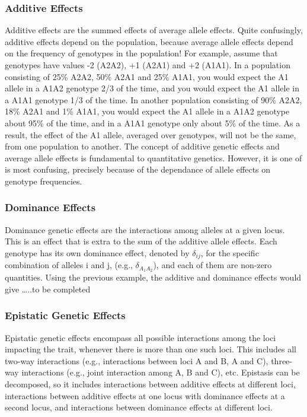 \documentclass[
]{book}
\begin{document}
\hypertarget{additive-effects}{%
\subsubsection{Additive Effects}\label{additive-effects}}

Additive effects are the summed effects of average allele effects. Quite confusingly, additive effects depend on the population, because average allele effects depend on the frequency of genotypes in the population! For example, assume that genotypes have values -2 (A2A2), +1 (A2A1) and +2 (A1A1). In a population consisting of 25\% A2A2, 50\% A2A1 and 25\% A1A1, you would expect the A1 allele in a A1A2 genotype 2/3 of the time, and you would expect the A1 allele in a A1A1 genotype 1/3 of the time. In another population consisting of 90\% A2A2, 18\% A2A1 and 1\% A1A1, you would expect the A1 allele in a A1A2 genotype about 95\% of the time, and in a A1A1 genotype only about 5\% of the time. As a result, the effect of the A1 allele, averaged over genotypes, will not be the same, from one population to another.
The concept of additive genetic effects and average allele effects is fundamental to quantitative genetics. However, it is one of is most confusing, precisely because of the dependance of allele effects on genotype frequencies.

\hypertarget{dominance-effects}{%
\subsubsection{Dominance Effects}\label{dominance-effects}}

Dominance genetic effects are the interactions among alleles at a given locus. This is an effect that is extra to the sum of the additive allele effects. Each genotype has its own dominance effect, denoted by \(\delta_{ij}\), for the specific combination of alleles i and j, (e.g., \(\delta_{A_{1}A_{2}}\)), and each of them are non-zero quantities. Using the previous example, the additive and dominance effects would give \ldots..to be completed

\hypertarget{epistatic-genetic-effects}{%
\subsubsection{Epistatic Genetic Effects}\label{epistatic-genetic-effects}}

Epistatic genetic effects encompass all possible interactions among the loci impacting the trait, whenever there is more than one such loci. This includes all two-way interactions (e.g., interactions between loci A and B, A and C), three-way interactions (e.g., joint interaction among A, B and C), etc. Epistasis can be decomposed, so it includes interactions between additive effects at different loci, interactions between additive effects at one locus with dominance effects at a second locus, and interactions between dominance effects at different loci.
\end{document}
